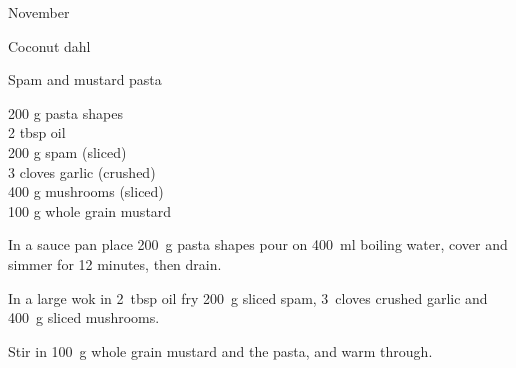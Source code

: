 \begin{menu}{November}
\begin{recipe}{2}{Coconut dahl}
\begin{instructions}
    \end{instructions}
    \end{recipe}%
  
    \begin{recipe}{1}{Spam and mustard pasta}%
		\begin{ingredients}
		200 g pasta shapes  \\
	2 tbsp oil  \\
	200 g spam (sliced) \\
	3 cloves garlic (crushed) \\
	400 g mushrooms (sliced) \\
	100 g whole grain mustard  \\
	
		\end{ingredients}
	
    \begin{instructions}
    \item 
      In a
      sauce pan
      place
      200~g  pasta shapes
      pour on
      400~ml  boiling water,
      cover and simmer for 12 minutes, then drain.
    \item 
        In a large wok in
        2~tbsp  oil
        fry
        200~g sliced spam,
        3~cloves crushed garlic
        and
        400~g sliced mushrooms.
      \item 
        Stir in
        100~g  whole grain mustard
        and the pasta,
        and warm through.
      
    \end{instructions}
    \end{recipe}%
  
    \clearpage
    \end{menu}
	
